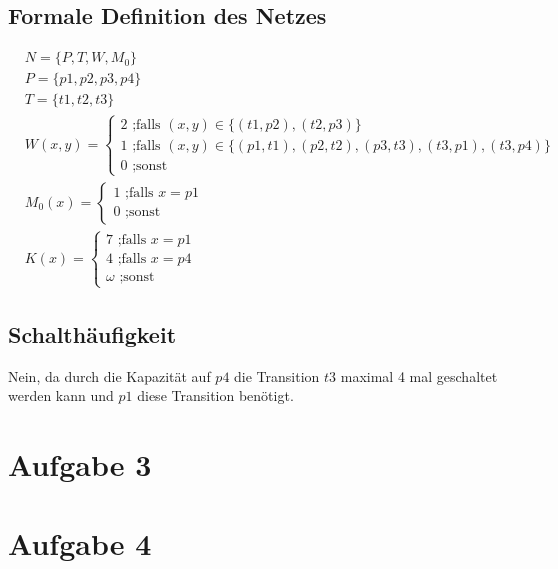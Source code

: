 \documentclass[10pt]{scrartcl}
\begin{document}
	\subsection{Formale Definition des Netzes}
	\begin{align}
	&N =\{P,T,W,M_0\}\\
	&P =\{p1,p2,p3,p4\}\\
	&T =\{t1,t2,t3\}\\
	&W(x,y) =\begin{cases}
			2 \text{ ;falls } (x,y) \in \{(t1,p2),(t2,p3)\} \\
			1 \text{ ;falls } (x,y) \in \{(p1,t1),(p2,t2), (p3,t3), (t3,p1), (t3,p4)\} \\
			0 \text{ ;sonst}
	     \end{cases}\\
	&M_0(x)=  \begin{cases}
			1 \text{ ;falls } x=p1\\
			0 \text{ ;sonst}
	     \end{cases}\\  
	&K(x)=  \begin{cases}
			7 \text{ ;falls } x=p1\\
			4 \text{ ;falls } x=p4\\
			\omega \text{ ;sonst}
	     \end{cases} 	      
	\end{align}	

	\subsection{Schalthäufigkeit}
	Nein, da durch die Kapazität auf $p4$ die Transition $t3$ maximal 4 mal geschaltet werden kann und $p1$ diese Transition benötigt. 

\section{Aufgabe 3}

\section{Aufgabe 4}
\end{document}
